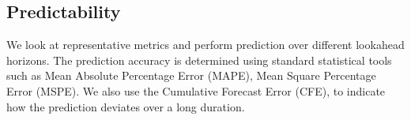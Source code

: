 \subsection{Predictability}
We look at representative metrics and perform prediction over different lookahead horizons. The prediction accuracy is determined using standard statistical tools such as Mean Absolute Percentage Error (MAPE), Mean Square Percentage Error (MSPE). We also use the Cumulative Forecast Error (CFE), to indicate how the prediction deviates over a long duration. 

